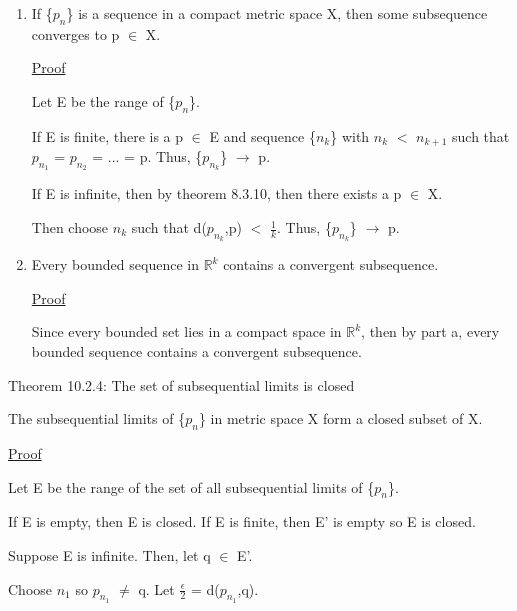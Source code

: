     \begin{enumerate}[label=(\alph*), leftmargin=2cm, itemsep=0.1cm]
        \item If \{$p_n$\} is a sequence in a compact metric space X,
        then some subsequence converges to p $\in$ X.

            { \color{magenta} \underline{Proof} }

                Let E be the range of \{$p_n$\}.

                If E is finite, there is a p $\in$ E and sequence
                \{$n_k$\} with $n_k$ $<$ $n_{k+1}$ such that
                $p_{n_1}$ = $p_{n_2}$ = ... = p.
                Thus, \{$p_{n_k}$\} $\rightarrow$ p.

                If E is infinite, then by {\color{red} theorem 8.3.10},
                then there exists a p $\in$ X.

                Then choose $n_k$ such that d($p_{n_k}$,p) $<$ $\frac{1}{k}$.
                Thus, \{$p_{n_k}$\} $\rightarrow$ p.

        \item Every bounded sequence in $\mathbb{R}^k$ contains
        a convergent subsequence.

            { \color{magenta} \underline{Proof} }

                Since every bounded set lies in a compact space in
                $\mathbb{R}^k$, then by part a, every bounded sequence
                contains a convergent subsequence. \\
    \end{enumerate}

{ \color{red} Theorem 10.2.4: The set of subsequential limits is closed }

    \begin{adjustbox}{minipage=14cm, right, vspace=0.1cm 0cm}
        The subsequential limits of \{$p_n$\} in metric space X form
        a closed subset of X.
    \end{adjustbox}

{ \color{magenta} \underline{Proof} }

    Let E be the range of the set of all subsequential limits of \{$p_n$\}.
    
    If E is empty, then E is closed.
    If E is finite, then E' is empty so E is closed.

    Suppose E is infinite. Then, let q $\in$ E'.

    Choose $n_1$ so $p_{n_1}$ $\not =$ q. Let $\frac{\epsilon}{2}$ = d($p_{n_1}$,q).

